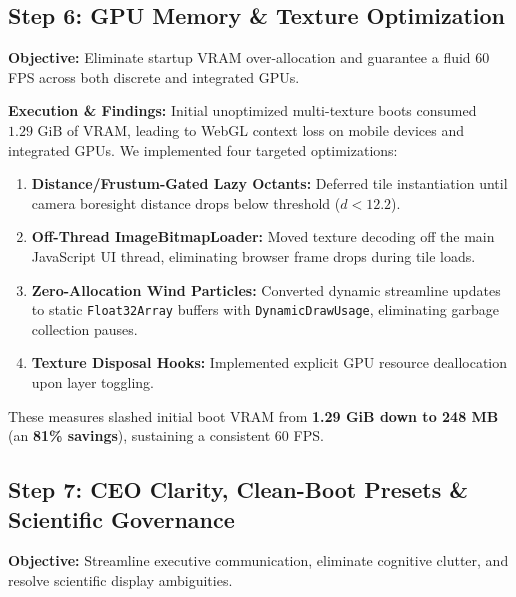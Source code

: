 \documentclass[10pt,twocolumn,letterpaper]{article}
\begin{document}
\subsection{Step 6: GPU Memory \& Texture Optimization}
\textbf{Objective:} Eliminate startup VRAM over-allocation and guarantee a fluid 60 FPS across both discrete and integrated GPUs.

\textbf{Execution \& Findings:} Initial unoptimized multi-texture boots consumed $1.29\text{ GiB}$ of VRAM, leading to WebGL context loss on mobile devices and integrated GPUs. We implemented four targeted optimizations:
\begin{enumerate}[leftmargin=*,noitemsep,topsep=1pt]
    \item \textbf{Distance/Frustum-Gated Lazy Octants:} Deferred tile instantiation until camera boresight distance drops below threshold ($d < 12.2$).
    \item \textbf{Off-Thread ImageBitmapLoader:} Moved texture decoding off the main JavaScript UI thread, eliminating browser frame drops during tile loads.
    \item \textbf{Zero-Allocation Wind Particles:} Converted dynamic streamline updates to static \texttt{Float32Array} buffers with \texttt{DynamicDrawUsage}, eliminating garbage collection pauses.
    \item \textbf{Texture Disposal Hooks:} Implemented explicit GPU resource deallocation upon layer toggling.
\end{enumerate}
These measures slashed initial boot VRAM from \textbf{1.29 GiB down to 248 MB} (an \textbf{81\% savings}), sustaining a consistent 60 FPS.

\subsection{Step 7: CEO Clarity, Clean-Boot Presets \& Scientific Governance}
\textbf{Objective:} Streamline executive communication, eliminate cognitive clutter, and resolve scientific display ambiguities.
\end{document}
